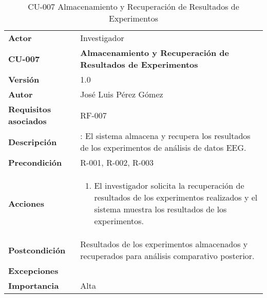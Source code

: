 \begin{table}[p]
	\centering
	\begin{tabularx}{\linewidth}{ p{} p{} }
		\toprule
		\textbf{Actor}              & Investigador    \\
		\textbf{CU-007}    & \textbf{Almacenamiento y Recuperación de Resultados de Experimentos}\\
		\toprule
		\textbf{Versión}              & 1.0    \\
		\textbf{Autor}                & José Luis Pérez Gómez \\
		\textbf{Requisitos asociados} & RF-007 \\
		\textbf{Descripción}          & : El sistema almacena y recupera los resultados de los experimentos de análisis de datos EEG.\\
		\textbf{Precondición}         & R-001, R-002, R-003\\
		\textbf{Acciones}             &
		\begin{enumerate}
			\def\labelenumi{\arabic{enumi}.}
			\tightlist
			\item El investigador solicita la recuperación de resultados de los experimentos realizados y el sistema muestra los resultados de los experimentos.
			
		\end{enumerate}\\
		\textbf{Postcondición}        & Resultados de los experimentos almacenados y recuperados para análisis comparativo posterior.\\
		\textbf{Excepciones}          &  \\
		\textbf{Importancia}          & Alta \\
		\bottomrule
	\end{tabularx}
	\caption{CU-007 Almacenamiento y Recuperación de Resultados de Experimentos}
\end{table}


